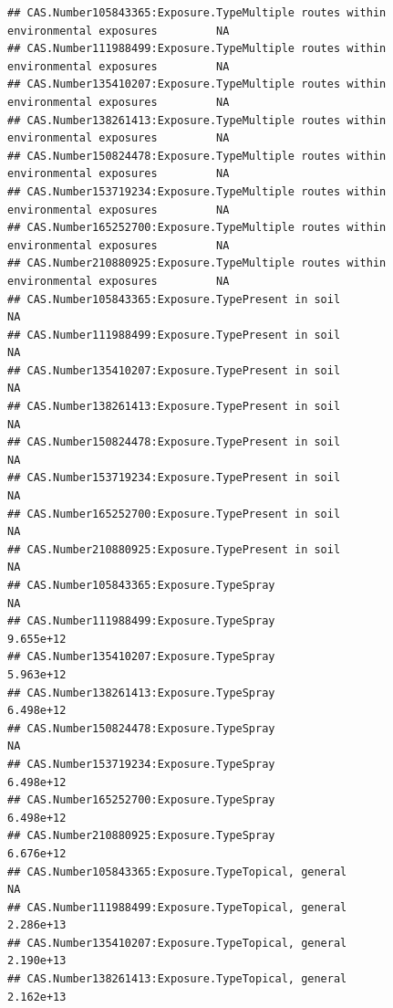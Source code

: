 \documentclass[
  12pt,
]{article}
\begin{document}
\begin{verbatim}
## CAS.Number105843365:Exposure.TypeMultiple routes within environmental exposures         NA
## CAS.Number111988499:Exposure.TypeMultiple routes within environmental exposures         NA
## CAS.Number135410207:Exposure.TypeMultiple routes within environmental exposures         NA
## CAS.Number138261413:Exposure.TypeMultiple routes within environmental exposures         NA
## CAS.Number150824478:Exposure.TypeMultiple routes within environmental exposures         NA
## CAS.Number153719234:Exposure.TypeMultiple routes within environmental exposures         NA
## CAS.Number165252700:Exposure.TypeMultiple routes within environmental exposures         NA
## CAS.Number210880925:Exposure.TypeMultiple routes within environmental exposures         NA
## CAS.Number105843365:Exposure.TypePresent in soil                                        NA
## CAS.Number111988499:Exposure.TypePresent in soil                                        NA
## CAS.Number135410207:Exposure.TypePresent in soil                                        NA
## CAS.Number138261413:Exposure.TypePresent in soil                                        NA
## CAS.Number150824478:Exposure.TypePresent in soil                                        NA
## CAS.Number153719234:Exposure.TypePresent in soil                                        NA
## CAS.Number165252700:Exposure.TypePresent in soil                                        NA
## CAS.Number210880925:Exposure.TypePresent in soil                                        NA
## CAS.Number105843365:Exposure.TypeSpray                                                  NA
## CAS.Number111988499:Exposure.TypeSpray                                           9.655e+12
## CAS.Number135410207:Exposure.TypeSpray                                           5.963e+12
## CAS.Number138261413:Exposure.TypeSpray                                           6.498e+12
## CAS.Number150824478:Exposure.TypeSpray                                                  NA
## CAS.Number153719234:Exposure.TypeSpray                                           6.498e+12
## CAS.Number165252700:Exposure.TypeSpray                                           6.498e+12
## CAS.Number210880925:Exposure.TypeSpray                                           6.676e+12
## CAS.Number105843365:Exposure.TypeTopical, general                                       NA
## CAS.Number111988499:Exposure.TypeTopical, general                                2.286e+13
## CAS.Number135410207:Exposure.TypeTopical, general                                2.190e+13
## CAS.Number138261413:Exposure.TypeTopical, general                                2.162e+13

\end{verbatim}
\end{document}
